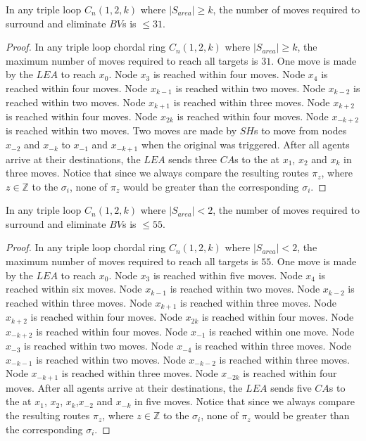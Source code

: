  
 \begin{theorem}
In any triple loop   $C_n(1,2,k)$ where $\left\vert{S_{area}}\right\vert \ge k$,  the number of moves required to surround and eliminate $BV$s is $\leq31$.
\end{theorem}
 \begin{proof}
In any triple loop chordal ring $C_n(1,2,k)$ where $\left\vert{S_{area}}\right\vert \ge k$, the maximum number of moves required to reach all targets is $31$. 
 One move is made by the $LEA$ to reach $x_0$. Node $x_{3}$ is reached within four moves.
  Node $x_{4}$ is reached within four moves.
  Node $x_{k-1}$ is reached within two moves.
  Node $x_{k-2}$ is reached within two moves.
  Node $x_{k+1}$ is reached within three moves.
  Node $x_{k+2}$ is reached within four moves.
  Node $x_{2k}$ is reached within four moves.
  Node $x_{-k+2}$ is reached within two moves.
 Two moves are made by $SH$s to move from  nodes $x_{-2}$ and $x_{-k}$ to $x_{-1}$ and $x_{-k+1}$  when the original \bv was triggered.
 After all agents arrive at their destinations, the $LEA$ sends three $CA$s to the \bvs at $x_{1}$, $x_{2}$ and $x_{k}$ in three moves. Notice that since we always compare the resulting routes $\pi_z$, where $z \in \mathbb{Z}$  to the  $\sigma_i$, none of $\pi_z$ would be greater than the corresponding $\sigma_i$. 
\end{proof}

\begin{theorem}
In any triple loop   $C_n(1,2,k)$ where $\left\vert{S_{area}}\right\vert < 2$,  the number of moves required to surround and eliminate $BV$s is $\leq55$.
\end{theorem}
 \begin{proof}
In any triple loop chordal ring $C_n(1,2,k)$ where $\left\vert{S_{area}}\right\vert <2$, the maximum number of moves required to reach all targets is $55$. 
 One move is made by the $LEA$ to reach $x_0$.
  Node $x_{3}$ is reached within five moves.
  Node $x_{4}$ is reached within six moves.
  Node $x_{k-1}$ is reached within two moves.
  Node $x_{k-2}$ is reached within three moves.
  Node $x_{k+1}$ is reached within three moves.
  Node $x_{k+2}$ is reached within four moves.
  Node $x_{2k}$ is reached within four moves.
  Node $x_{-k+2}$ is reached within four moves.
  Node $x_{-1}$ is reached within one move.
  Node $x_{-3}$ is reached within two moves.
  Node $x_{-4}$ is reached within three moves.
  Node $x_{-k-1}$ is reached within two moves.
  Node $x_{-k-2}$ is reached within three moves.
  Node $x_{-k+1}$ is reached within three moves.
  Node $x_{-2k}$ is reached within four moves.
 After all agents arrive at their destinations, the $LEA$ sends five $CA$s to the \bvs at $x_{1}$, $x_{2}$, $x_{k}$,$x_{-2}$ and $x_{-k}$ in five moves. Notice that since we always compare the resulting routes $\pi_z$, where $z \in \mathbb{Z}$  to the  $\sigma_i$, none of $\pi_z$ would be greater than the corresponding $\sigma_i$. 
\end{proof}

